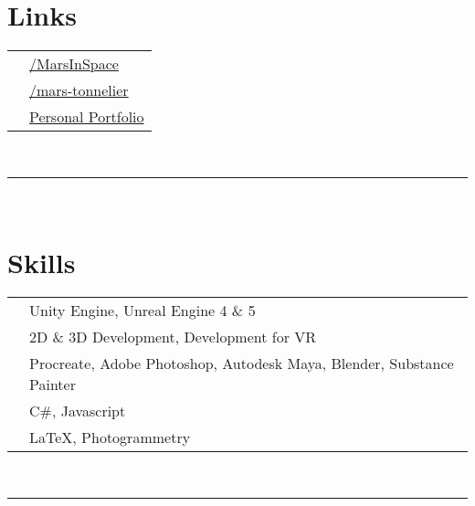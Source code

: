 \documentclass[oneside]{article}
\begin{document}
{\begin{minipage}[t][\textheight-2\fboxsep-2\fboxrule][t]{\dimexpr0.40\textwidth-2\fboxrule-2\fboxsep\relax}
        \section*{\large Links}
        \begin{tabular}{cl}
            \faGithub{}   & \href{https://github.com/MarsInSpace}{/MarsInSpace} \\
            \faLinkedin{} & \href{https://www.linkedin.com/in/mars-tonnelier/}{/mars-tonnelier} \\
            \faStar{} & \href{https://marstificer.carbonmade.com/}{Personal Portfolio} \\
        \end{tabular}
        \vspace{10pt} \\
        \rule{\linewidth}{0.4pt} \\
        \section*{\large Skills}
        \begin{tabularx}{\textwidth}{cY}
            \faCogs{}        & Unity Engine, Unreal Engine 4 \& 5 \\
            \faGamepad{}     & 2D \& 3D Development, Development for VR \\
            \faPalette{}     & Procreate, Adobe Photoshop, Autodesk Maya, Blender, Substance Painter \\
            \faCode{}        & C\#, Javascript \\
            \faToolbox{}     & \LaTeX, Photogrammetry \\
        \end{tabularx}
        \vspace{1pt} \\
        \rule{\linewidth}{0.4pt}

\end{minipage}}
\end{document}
